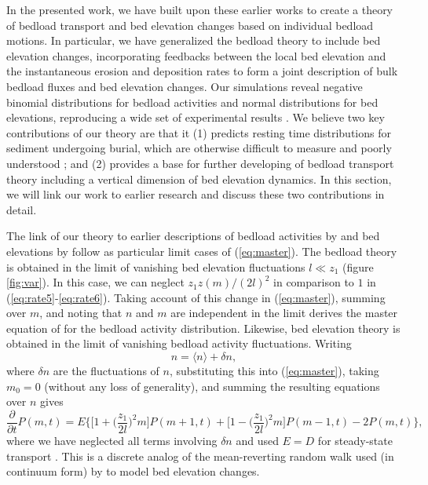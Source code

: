 \documentclass[draft]{agujournal2018}
\newcommand\be{\begin{equation}} %
\newcommand\ee{\end{equation}}   %
\newcommand\bra{\langle}
\newcommand\ket{\rangle}
\begin{document}
In the presented work, we have built upon these earlier works to create a theory of bedload transport and bed elevation changes based on individual bedload motions.
In particular, we have generalized the \citet{Ancey2008} bedload theory to include bed elevation changes, incorporating feedbacks between the local bed elevation and the instantaneous erosion and deposition rates \citep[e.g.][]{Wong2007} to form a joint description of bulk bedload fluxes and bed elevation changes.
Our simulations reveal negative binomial distributions for bedload activities and normal distributions for bed elevations, reproducing a wide set of experimental results \citep{Ancey2008, Heyman2016, Wong2007, Singh2009, Martin2014}.
We believe two key contributions of our theory are that it (1) predicts resting time distributions for sediment undergoing burial, which are otherwise difficult to measure and poorly understood \citep[e.g.][]{Voepel2013, Martin2014, Bradley2017}; and (2) provides a base for further developing of bedload transport theory including a vertical dimension of bed elevation dynamics.
In this section, we will link our work to earlier research and discuss these two contributions in detail.


The link of our theory to earlier descriptions of bedload activities by \citet{Ancey2008} and bed elevations by \citet{Martin2014} follow as particular limit cases of (\ref{eq:master}).
The \citet{Ancey2008} bedload theory is obtained in the limit of vanishing bed elevation fluctuations $l\ll z_1$ (figure \ref{fig:var}).
In this case, we can neglect $z_1 z(m)/(2l)^2$ in comparison to $1$ in (\ref{eq:rate5}-\ref{eq:rate6}). Taking account of this change in (\ref{eq:master}), summing over $m$, and noting that $n$ and $m$ are independent in the limit derives the master equation of \citet{Ancey2008} for the bedload activity distribution.
Likewise, \citet{Martin2014} bed elevation theory is obtained in the limit of vanishing bedload activity fluctuations.
Writing
\be n = \bra n \ket + \delta n \label{eq:mft}, \ee
where $\delta n$ are the fluctuations of $n$,  substituting this into (\ref{eq:master}), taking $m_0=0$ (without any loss of generality), and summing the resulting equations over $n$ gives
\be \frac{\partial}{\partial t}P(m,t) =  E \Big\{ \Big[1 +\Big(\frac{z_1}{2 l}\Big)^2m\Big]P(m+1,t) +  \Big[1 -\Big(\frac{z_1}{2 l}\Big)^2m\Big]P(m-1,t) - 2P(m,t)\Big\}, \label{eq:ou}\ee
where we have neglected all terms involving $\delta n$ and used $E=D$ for steady-state transport \citep[e.g.][]{Einstein1950}.
This is a discrete analog of the mean-reverting random walk used (in continuum form) by \citet{Martin2014} to model bed elevation changes.
\end{document}
